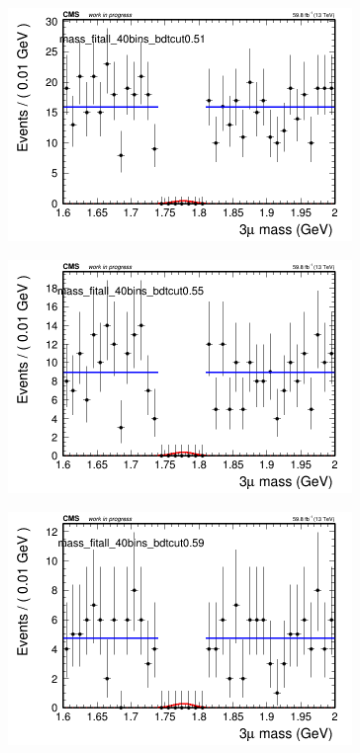 \begin{figure}[H]
\begin{subfigure}{0.2\textwidth}
        \caption{}
    \end{subfigure}
    \begin{subfigure}{0.2\textwidth}
        \includegraphics[width=\textwidth]{flat_fit/plots/all/massfit_all_40bins_bdtcut0.51.png}
        \caption{}
    \end{subfigure}
    \begin{subfigure}{0.2\textwidth}
        \includegraphics[width=\textwidth]{flat_fit/plots/all/massfit_all_40bins_bdtcut0.55.png}
        \caption{}
    \end{subfigure}
    \begin{subfigure}{0.2\textwidth}
        \includegraphics[width=\textwidth]{flat_fit/plots/all/massfit_all_40bins_bdtcut0.59.png}

\end{subfigure}
\end{figure}
